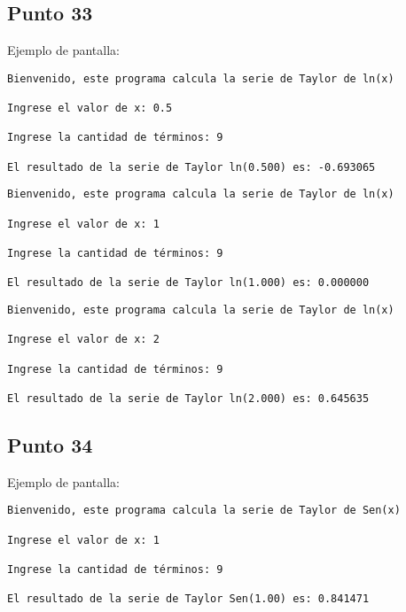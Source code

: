 



\subsection{Punto 33}
	
	Ejemplo de pantalla:
\begin{lstlisting}
Bienvenido, este programa calcula la serie de Taylor de ln(x)

Ingrese el valor de x: 0.5

Ingrese la cantidad de términos: 9

El resultado de la serie de Taylor ln(0.500) es: -0.693065
\end{lstlisting}

\begin{lstlisting}
Bienvenido, este programa calcula la serie de Taylor de ln(x)

Ingrese el valor de x: 1

Ingrese la cantidad de términos: 9

El resultado de la serie de Taylor ln(1.000) es: 0.000000
\end{lstlisting}

\begin{lstlisting}
Bienvenido, este programa calcula la serie de Taylor de ln(x)

Ingrese el valor de x: 2

Ingrese la cantidad de términos: 9

El resultado de la serie de Taylor ln(2.000) es: 0.645635
\end{lstlisting}





\subsection{Punto 34}
	
	Ejemplo de pantalla:
\begin{lstlisting}
Bienvenido, este programa calcula la serie de Taylor de Sen(x)

Ingrese el valor de x: 1

Ingrese la cantidad de términos: 9

El resultado de la serie de Taylor Sen(1.00) es: 0.841471
\end{lstlisting}

